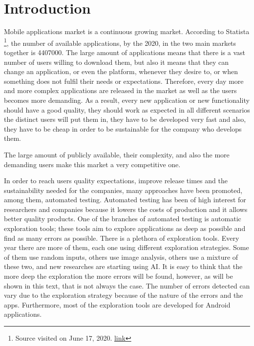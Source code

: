 
\chapter{Introduction} %

\label{Chapter1} %

Mobile applications market is a continuous growing market. According to Statista \footnote{Source visited on June 17, 2020. \href{https://www.statista.com/statistics/276623/number-of-apps-available-in-leading-app-stores/\#:~:text=As\%20of\%20the\%20first\%20quarter,million\%20available\%20apps\%20for\%20iOS.}{link}}, the number of available applications, by the 2020, in the two main markets together is 4407000. The large amount of applications means that there is a vast number of users willing to download them, but also it means that they can change an application, or even the platform, whenever they desire to, or when something does not fulfil their needs or expectations. Therefore, every day more and more complex applications are released in the market as well as the users becomes more demanding. As a result, every new application or new functionality should have a good quality, they should work as expected in all different scenarios the distinct users will put them in, they have to be developed very fast and also, they have to be cheap in order to be sustainable for the company who develops them. 

The large amount of publicly available, their complexity, and also the more demanding users make this market a very competitive one.

In order to reach users quality expectations, improve release times  and the sustainability needed for the companies, many approaches have been promoted, among them, automated testing. Automated testing has been of high interest for researchers and companies because it lowers the costs of production and it allows better quality products. One of the branches of automated testing is automatic exploration tools; these tools aim to explore  applications as deep as possible and find as many errors as possible. There is a plethora of exploration tools. Every year there are more of them, each one using different exploration strategies. Some of them use random inputs, others use image analysis, others use a mixture of these two, and new researches are starting using AI. It is easy to think that the more deep the exploration the more errors will be found, however, as will be shown in this text, that is not always the case. The number of errors detected can vary due to the exploration strategy because of the nature of the errors  and the apps. Furthermore, most of the exploration tools are developed for Android applications.

